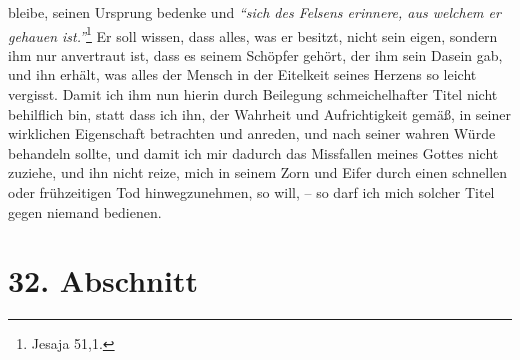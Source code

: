 bleibe,
seinen Ursprung bedenke und
\textit{"`sich des Felsens erinnere, aus welchem er gehauen
ist."'}\footnote{Jesaja 51,1.}
Er soll wissen, dass alles, was er besitzt, nicht sein
eigen, sondern ihm nur anvertraut ist, dass es seinem Schöpfer gehört, der ihm
sein Dasein gab, und ihn erhält, was alles der Mensch in der Eitelkeit
seines Herzens so leicht vergisst. Damit ich ihm nun hierin durch Beilegung
schmeichelhafter Titel nicht behilflich bin, statt dass ich ihn, der Wahrheit
und
Aufrichtigkeit gemäß, in seiner wirklichen Eigenschaft betrachten und anreden,
und nach seiner wahren Würde behandeln sollte, und damit ich mir dadurch das
Missfallen meines Gottes nicht zuziehe, und ihn nicht reize, mich in seinem Zorn
und Eifer durch einen schnellen oder frühzeitigen Tod hinwegzunehmen, so will,
-- so darf ich mich solcher Titel gegen niemand bedienen.

\section{32. Abschnitt} \label{kap9_ab32}

